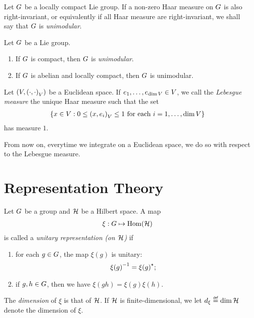 \begin{definition}
\label{definition:unimodular_group}
    Let $G$ be a locally compact Lie group.
    If a non-zero Haar measure on $G$ is also right-invariant,
    or equivalently if all Haar measure are right-invariant,
    we shall say that $G$ is \emph{unimodular}.
\end{definition}

\begin{proposition}
\label{proposition:sufficient_conditions_to_be_unimodular}
    Let $G$ be a Lie group.
    \begin{enumerate}
        \item If $G$ is compact, then $G$ is \emph{unimodular}.
        \item If $G$ is abelian and locally compact, then $G$ is unimodular.
    \end{enumerate}
\end{proposition}

\begin{definition}
\label{definition:Lebesgue_measure}
    Let $(V, {\left(\cdot, \cdot\right)_{V}})$ be a Euclidean space.
    If $e_1, \dots, e_{\dim V} \in V$,
    we call the \emph{Lebesgue measure} the unique Haar measure such that the set
    \begin{align*}
        \{ x \in V : 0 \leq {\left(x, e_i\right)_{V}} \leq 1 \text{ for each } i = 1, \dots, \dim V \}
    \end{align*}
    has measure $1$.
\end{definition}

From now on,
everytime we integrate on a Euclidean space,
we do so with respect to the Lebesgue measure.

\section{Representation Theory}

\begin{definition}
\label{definition:unitary_representation}
    Let $G$ be a group and $\mathcal{H}$ be a Hilbert space.
    A map
    \begin{align*}
        \xi : G \mapsto \operatorname{Hom}(\mathcal{H})
    \end{align*}
    is called a \emph{unitary representation (on $\mathcal{H}$)} if
    \begin{enumerate}
        \item for each $g \in G$, the map $\xi(g)$ is unitary:
            \begin{align*}
                {\xi(g)}^{-1} = {\xi(g)}^\star;
            \end{align*}
        \item if $g, h \in G$, then we have $\xi(g h) = \xi(g) \xi(h)$.
    \end{enumerate}

    The \emph{dimension} of $\xi$ is that of $\mathcal{H}$.
    If $\mathcal{H}$ is finite-dimensional,
    we let $\dimRep{\xi} \defeq \dim{\Hil}$ denote the dimension of $\xi$.
\end{definition}

